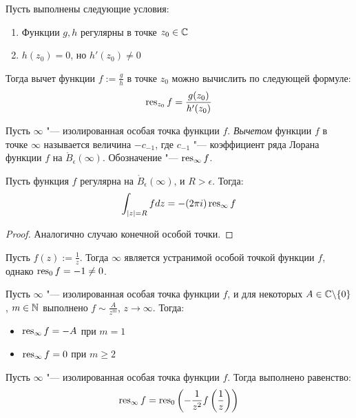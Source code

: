 \begin{proposition}
	Пусть выполнены следующие условия:
	\begin{enumerate}
		\item Функции $g, h$ регулярны в точке $z_0 \in \mathbb{C}$
		\item $h(z_0) = 0$, но $h'(z_0) \ne 0$
	\end{enumerate}

	Тогда вычет функции $f := \frac{g}{h}$ в точке $z_0$ можно вычислить по следующей формуле:
	\[\operatorname{res}_{z_0}f = \frac{g(z_0)}{h'(z_0)}\]
\end{proposition}

\begin{definition}
	Пусть $\infty$ "--- изолированная особая точка функции $f$. \textit{Вычетом} функции $f$ в точке $\infty$ называется величина $-c_{-1}$, где $c_{-1}$ "--- коэффициент ряда Лорана функции $f$ на $\mathring B_\epsilon(\infty)$. Обозначение "--- $\operatorname{res}_{\infty}f$.
\end{definition}

\begin{proposition}
	Пусть функция $f$ регулярна на $\mathring B_\epsilon(\infty)$, и $R > \epsilon$. Тогда:
	\[\int_{|z| = R}fdz = -(2\pi i)\operatorname{res}_\infty f\]
\end{proposition}

\begin{proof}
	Аналогично случаю конечной особой точки.
\end{proof}

\begin{example}
	Пусть $f(z) := \frac 1z$. Тогда $\infty$ является устранимой особой точкой функции $f$, однако $\operatorname{res}_0{f} = -1 \ne 0$.
\end{example}

\begin{proposition}
	Пусть $\infty$ "--- изолированная особая точка функции $f$, и для некоторых $A \in \mathbb{C} \backslash \{0\}$, $m \in \mathbb{N}$ выполнено $f \sim \frac{A}{z^m}$, $z \to \infty$. Тогда:
	\begin{itemize}
		\item $\operatorname{res}_\infty f = -A$ при $m = 1$
		\item $\operatorname{res}_\infty f = 0$ при $m \ge 2$
	\end{itemize}
\end{proposition}

\begin{proposition}
	Пусть $\infty$ "--- изолированная особая точка функции $f$. Тогда выполнено равенство:
	\[\operatorname{res}_\infty f = \operatorname{res}_0\left(-\frac1{z^2}f\left(\frac1z\right)\right)\]
\end{proposition}

